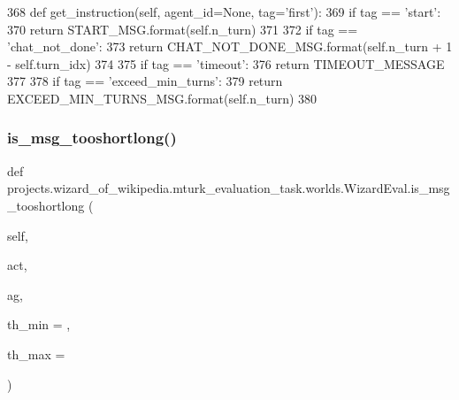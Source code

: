 \begin{DoxyCode}
368     \textcolor{keyword}{def }get\_instruction(self, agent\_id=None, tag='first'):
369         \textcolor{keywordflow}{if} tag == \textcolor{stringliteral}{'start'}:
370             \textcolor{keywordflow}{return} START\_MSG.format(self.n\_turn)
371 
372         \textcolor{keywordflow}{if} tag == \textcolor{stringliteral}{'chat\_not\_done'}:
373             \textcolor{keywordflow}{return} CHAT\_NOT\_DONE\_MSG.format(self.n\_turn + 1 - self.turn\_idx)
374 
375         \textcolor{keywordflow}{if} tag == \textcolor{stringliteral}{'timeout'}:
376             \textcolor{keywordflow}{return} TIMEOUT\_MESSAGE
377 
378         \textcolor{keywordflow}{if} tag == \textcolor{stringliteral}{'exceed\_min\_turns'}:
379             \textcolor{keywordflow}{return} EXCEED\_MIN\_TURNS\_MSG.format(self.n\_turn)
380 
\end{DoxyCode}
\mbox{\label{classprojects_1_1wizard__of__wikipedia_1_1mturk__evaluation__task_1_1worlds_1_1WizardEval_ac6b1cd76a8d7270fb0d879c2ec77abf5}} 
\subsubsection{\texorpdfstring{is\+\_\+msg\+\_\+tooshortlong()}{is\_msg\_tooshortlong()}}
{\footnotesize\ttfamily def projects.\+wizard\+\_\+of\+\_\+wikipedia.\+mturk\+\_\+evaluation\+\_\+task.\+worlds.\+Wizard\+Eval.\+is\+\_\+msg\+\_\+tooshortlong (\begin{DoxyParamCaption}\item[{}]{self,  }\item[{}]{act,  }\item[{}]{ag,  }\item[{}]{th\+\_\+min = {},  }\item[{}]{th\+\_\+max = {} }\end{DoxyParamCaption})}



